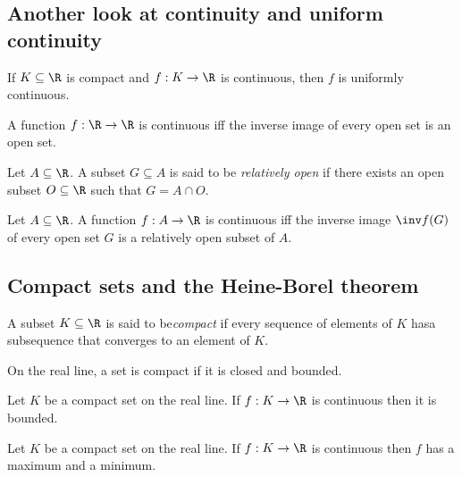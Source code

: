 \documentclass{article}
\begin{document}
\subsection{Another look at continuity and uniform continuity}

\begin{proposition}[Notes 2.23]
    If $K\subseteq\R$ is compact and $f:K\to\R$ is continuous, then $f$ is
    uniformly continuous.
\end{proposition}

\begin{proposition}[Notes 2.24]
    A function $f:\R\to\R$ is continuous iff the inverse image of every
    open set is an open set.
\end{proposition}

\begin{definition}
    Let $A\subseteq\R$. A subset $G\subseteq A$ is said to be \emph{relatively open}
    if there exists an open subset $O\subseteq\R$ such that $G=A\cap O$.
\end{definition}

\begin{theorem}
    Let $A\subseteq\R$. A function $f:A\to\R$ is continuous iff the inverse
    image $\inv f(G)$ of every open set $G$ is a relatively open subset of $A$.
\end{theorem}

\subsection{Compact sets and the Heine-Borel theorem}

\begin{definition}
    A subset $K\subseteq\R$ is said to be\emph{compact} if every sequence of elements
    of $K$ hasa subsequence that converges to an element of $K$.
\end{definition}

\begin{theorem}[Notes 2.15]
    On the real line, a set is compact if it is closed and bounded.
\end{theorem}

\begin{theorem}[Notes 2.17]
    Let $K$ be a compact set on the real line. If $f:K\to\R$ is continuous
    then it is bounded.
\end{theorem}

\begin{theorem}
    Let $K$ be a compact set on the real line. If $f:K\to\R$ is continuous
    then $f$ has a maximum and a minimum.
\end{theorem}
\end{document}
